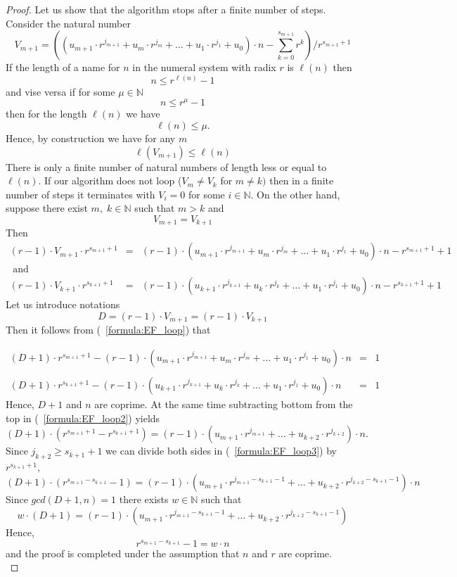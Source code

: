 \documentclass[color=black,11pt]{elegantpaper}
\begin{document}
\begin{proof}
Let us show that the algorithm stops after a finite number of steps. Consider the natural number
$$
V_{m+1} =((u_{m+1} \cdot r^{j_{m+1}}+u_m \cdot r^{j_m} + \dots+u_1 \cdot r^{j_1} + u_0) \cdot n - \sum_{k=0}^{s_{m+1}} r^k)/r^{s_{m+1} +1}
$$ 
If the length of a name for $n$ in the numeral system with radix $r$ is $\ell(n)$ then
$$
n \le r^{\ell(n)}-1
$$
and vise versa if for some $\mu \in \mathbb{N}$
$$
n\le r^{\mu} -1
$$
then for the length $\ell(n)$ we have
$$
\ell(n) \le \mu .
$$
Hence, by construction we have for any $m$
$$
\ell(V_{m+1}) \le \ell(n)
$$
There is only a finite number of natural numbers of length less or equal to $\ell(n).$ If our algorithm does not loop ($V_m \not= V_k$ for $m\not= k)$ then in a finite number of steps  it terminates with $V_i=0$ for some $i \in \mathbb{N}.$ On the other hand, suppose there exist $m,\;k \in \mathbb{N}$ such that $m> k$ and
$$
V_{m+1} = V_{k+1}
$$ 
Then
\begin{eqnarray}
\label{formula:EF_loop}
(r-1) \cdot V_{m+1} \cdot r^{s_{m+1} +1} &=&(r-1)\cdot (u_{m+1} \cdot r^{j_{m+1}}+u_m \cdot r^{j_m} + \dots+u_1 \cdot r^{j_1} + u_0) \cdot n -  r^{s_{m+1}+1} + 1 \nonumber \\
\mbox{ and } \qquad \qquad \qquad \qquad&&\\ 
(r-1) \cdot V_{k+1} \cdot r^{s_{k+1} +1} &=&(r-1)\cdot (u_{k+1} \cdot r^{j_{k+1}}+u_k \cdot r^{j_k} + \dots+u_1 \cdot r^{j_1} + u_0) \cdot n -  r^{s_{k+1}+1} + 1 \nonumber
\end{eqnarray}
Let us introduce notations
$$
D =  (r-1) \cdot V_{m+1} = (r-1) \cdot V_{k+1}
$$
Then it follows from (~\ref{formula:EF_loop}) that

\begin{eqnarray}
\label{formula:EF_loop2}
(D+1) \cdot r^{s_{m+1} +1} - (r-1)\cdot (u_{m+1} \cdot r^{j_{m+1}}+u_m \cdot r^{j_m} + \dots+u_1 \cdot r^{j_1} + u_0) \cdot n &=& 1 \nonumber \\
&&\\
(D+1) \cdot r^{s_{k+1} +1} - (r-1)\cdot (u_{k+1} \cdot r^{j_{k+1}}+u_k \cdot r^{j_k} + \dots+u_1 \cdot r^{j_1} + u_0) \cdot n &=& 1 \nonumber
\end{eqnarray}
Hence, $D+1$ and $n$ are coprime. At the same time subtracting bottom from the top in (~\ref{formula:EF_loop2}) yields
\begin{equation}
\label{formula:EF_loop3}
(D+1) \cdot (r^{s_{m+1} +1} - r^{s_{k+1} +1}) = (r-1)\cdot (u_{m+1} \cdot r^{j_{m+1}}+ \dots + u_{k+2} \cdot r^{j_{k+2}}) \cdot n.
\end{equation}
Since $j_{k+2} \ge s_{k+1} +1$ we can divide both sides in  (~\ref{formula:EF_loop3}) by $r^{s_{k+1} +1},$
$$
(D+1)\cdot (r^{s_{m+1} - s_{k+1}} -1) = (r-1)\cdot (u_{m+1} \cdot r^{j_{m+1}-s_{k+1}-1}+ \dots + u_{k+2} \cdot r^{j_{k+2}-s_{k+1}-1}) \cdot n
$$
Since $gcd(D+1,n) =1$ there exists $w \in \mathbb{N}$ such that
$$
w \cdot (D+1) = (r-1)\cdot (u_{m+1} \cdot r^{j_{m+1}-s_{k+1}-1}+ \dots + u_{k+2} \cdot r^{j_{k+2}-s_{k+1}-1}) 
$$
Hence,
$$
r^{s_{m+1} - s_{k+1}} -1 = w \cdot n
$$
and the proof is completed under the assumption that $n$ and $r$ are coprime.\\


\end{proof}
\end{document}
